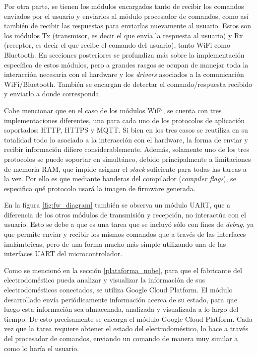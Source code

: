 Por otra parte, se tienen los módulos encargados tanto de recibir los comandos enviados por el usuario y enviarlos al módulo procesador de comandos, como así también de recibir las respuestas para enviarlas nuevamente al usuario. Estos son los módulos Tx (transmisor, es decir el que envía la respuesta al usuario) y Rx (receptor, es decir el que recibe el comando del usuario), tanto WiFi como Bluetooth. En secciones posteriores se profundiza más sobre la implementación específica de estos módulos, pero a grandes rasgos se ocupan de manejar toda la interacción necesaria con el hardware y los \emph{drivers} asociados a la comunicación WiFi/Bluetooth. También se encargan de detectar el comando/respuesta recibido y enviarlo a donde corresponda. 

Cabe mencionar que en el caso de los módulos WiFi, se cuenta con tres implementaciones diferentes, una para cada uno de los protocolos de aplicación soportados: HTTP, HTTPS y MQTT. Si bien en los tres casos se reutiliza en su totalidad todo lo asociado a la interacción con el hardware, la forma de enviar y recibir información difiere considerablemente. Además, solamente uno de los tres protocolos se puede soportar en simultáneo, debido principalmente a limitaciones de memoria RAM, que impide asignar el \emph{stack} suficiente para todas las tareas a la vez. Por ello es que mediante banderas del compilador (\emph{compiler flags}), se especifica qué protocolo usará la imagen de firmware generada.

En la figura \ref{fig:fw_diagram} también se observa un módulo UART, que a diferencia de los otros módulos de transmisión y recepción, no interactúa con el usuario. Esto se debe a que es una tarea que se incluyó sólo con fines de \emph{debug}, ya que permite enviar y recibir los mismos comandos que a través de las interfaces inalámbricas, pero de una forma mucho más simple utilizando una de las interfaces UART del microcontrolador.

Como se mencionó en la sección \ref{plataforma_nube}, para que el fabricante del electrodoméstico pueda analizar y visualizar la información de sus electrodomésticos conectados, se utiliza Google Cloud Platform. El módulo desarrollado envía periódicamente información acerca de su estado, para que luego esta información sea almacenada, analizada y visualizada a lo largo del tiempo. De esto precisamente se encarga el módulo Google Cloud Platform. Cada vez que la tarea requiere obtener el estado del electrodoméstico, lo hace a través del procesador de comandos, enviando un comando de manera muy similar a como lo haría el usuario.

